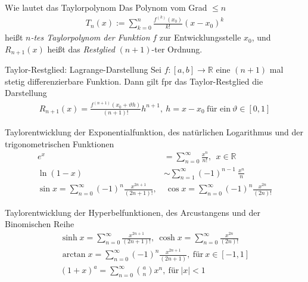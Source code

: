 \begin{karte}{Wie lautet das Taylorpolynom}
	Das Polynom vom Grad \(\leq n \)
	\begin{align}
		T_{n}(x):=\sum_{k=0}^n\frac{f^{(k)}(x_{0})}{k!}{(x-x_{0})}^{k} 
	\end{align}
	heißt \emph{\(n\)-tes Taylorpolynom der Funktion} \(f\) zur Entwicklungsstelle \(x_0\), und \(R_{n+1}(x)\) heißt das \emph{Restglied} \((n+1)\)-ter Ordnung.
\end{karte}

\begin{karte}{Taylor-Restglied: Lagrange-Darstellung}
	Sei \(f:[a,b]\to\mathbb{R}\) eine \((n+1)\) mal stetig differenzierbare Funktion. Dann gilt fpr das Taylor-Restglied die Darstellung
	{\large
		\begin{align}
			R_{n+1}(x)=\frac{f^{(n+1)}(x_{0}+\vartheta h)}{(n+1)!} h^{n+1},\ h=x-x_0\  \text{für ein}\ \vartheta\in[0,1] 
		\end{align}
	}
\end{karte}

\begin{karte}{Taylorentwicklung der Exponentialfunktion, des natürlichen Logarithmus und der trigonometrischen Funktionen}
	\begin{align}
		e^{x}                                                          & =\sum_{n=0}^{\infty}\frac{x^{n}}{n!},\ \ x\in\mathbb{R}     \\
		\ln{(1-x)}                                                     & \sim\sum_{n=1}^{\infty}{(-1)}^{n-1}\:\frac{x^{n}}{n}        \\
		\sin{x}=\sum_{n=0}^{\infty}{(-1)}^{n}\frac{x^{2n+1}}{(2n+1)!}, & \ \cos{x}=\sum_{n=0}^{\infty}{(-1)}^{n}\frac{x^{2n}}{(2n)!} 
	\end{align}
	
\end{karte}

\begin{karte}{Taylorentwicklung der Hyperbelfunktionen, des Arcustangens und der Binomischen Reihe}
	\begin{align}
		\sinh{x}=\sum_{n=0}^{\infty}\frac{x^{2n+1}}{(2n+1)!},\ \cosh{x}=\sum_{n=0}^{\infty}\frac{x^{2n}}{(2n)!} \\
		\arctan{x}=\sum_{n=0}^{\infty}{(-1)}^{n}\frac{x^{2n+1}}{(2n+1)},\ \text{für}\ x\in [-1,1]              \\
		{(1+x)}^{a}=\sum_{n=0}^{\infty}\binom{a}{n}x^{n},\ \text{für}\ \lvert x\rvert <1                       
	\end{align}
\end{karte}
